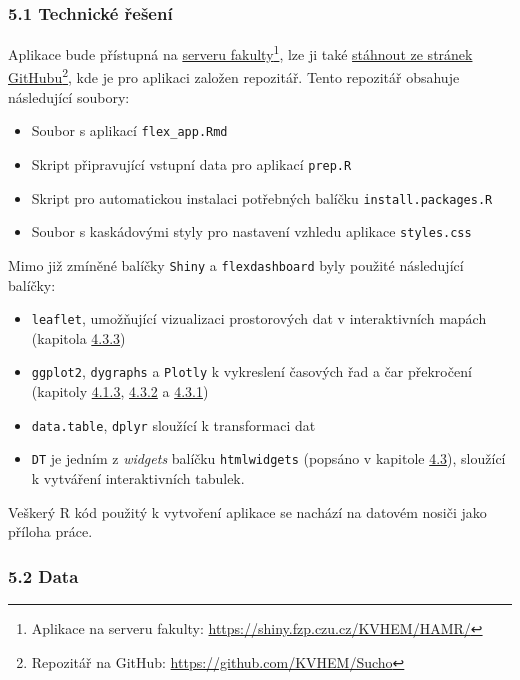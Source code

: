 \documentclass[12pt,]{article}
\providecommand{\tightlist}{%
  \setlength{\itemsep}{0pt}\setlength{\parskip}{0pt}}
\let\rmarkdownfootnote\footnote%
\def\footnote{\protect\rmarkdownfootnote}
\begin{document}
\hypertarget{techres}{\subsubsection{5.1 Technické
řešení}\label{techres}}

\qquad Aplikace bude přístupná na
\href{https://shiny.fzp.czu.cz/KVHEM/HAMR/}{serveru fakulty}\footnote{Aplikace
  na serveru fakulty: \url{https://shiny.fzp.czu.cz/KVHEM/HAMR/}}, lze
ji také \href{https://github.com/KVHEM/Sucho}{stáhnout ze stránek
GitHubu}\footnote{Repozitář na GitHub:
  \url{https://github.com/KVHEM/Sucho}}, kde je pro aplikaci založen
repozitář. Tento repozitář obsahuje následující soubory:

\begin{itemize}
\tightlist
\item
  Soubor s aplikací \texttt{flex\_app.Rmd}
\item
  Skript připravující vstupní data pro aplikací \texttt{prep.R}
\item
  Skript pro automatickou instalaci potřebných balíčku
  \texttt{install.packages.R}
\item
  Soubor s kaskádovými styly pro nastavení vzhledu aplikace
  \texttt{styles.css}
\end{itemize}

Mimo již zmíněné balíčky \texttt{Shiny} a \texttt{flexdashboard} byly
použité následující balíčky:

\begin{itemize}
\tightlist
\item
  \texttt{leaflet}, umožňující vizualizaci prostorových dat v
  interaktivních mapách (kapitola \protect\hyperlink{leaflet}{4.3.3})
\item
  \texttt{ggplot2}, \texttt{dygraphs} a \texttt{Plotly} k vykreslení
  časových řad a čar překročení (kapitoly
  \protect\hyperlink{ggplot}{4.1.3}, \protect\hyperlink{dygraphs}{4.3.2}
  a \protect\hyperlink{plotly}{4.3.1})
\item
  \texttt{data.table}, \texttt{dplyr} sloužící k transformaci dat
\item
  \texttt{DT} je jedním z \emph{widgets} balíčku \texttt{htmlwidgets}
  (popsáno v kapitole \protect\hyperlink{htmlwidgets}{4.3}), sloužící k
  vytváření interaktivních tabulek.
\end{itemize}

Veškerý R kód použitý k vytvoření aplikace se nachází na datovém nosiči
jako příloha práce.

\hypertarget{data}{\subsubsection{5.2 Data}\label{data}}
\end{document}

